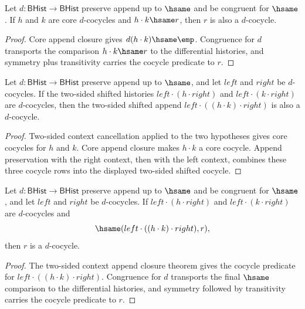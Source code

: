 \begin{theorem}
\label{thm:cohomology-cocycle-append-core-hsame-transport}
Let $d:\mathsf{BHist}\to\mathsf{BHist}$ preserve append up to $\hsame$ and
be congruent for $\hsame$. If $h$ and $k$ are core $d$-cocycles and
$h\cdot k\hsame r$, then $r$ is also a $d$-cocycle.
\end{theorem}
\begin{proof}
Core append closure gives $d(h\cdot k)\hsame\emp$. Congruence for $d$
transports the comparison $h\cdot k\hsame r$ to the differential histories,
and symmetry plus transitivity carries the cocycle predicate to $r$.
\end{proof}

\begin{theorem}
\label{thm:cohomology-cocycle-axis-context-append-closed}
Let $d:\mathsf{BHist}\to\mathsf{BHist}$ preserve append up to $\hsame$, and
let $left$ and $right$ be $d$-cocycles. If the two-sided shifted histories
$left\cdot(h\cdot right)$ and $left\cdot(k\cdot right)$ are $d$-cocycles,
then the two-sided shifted append $left\cdot((h\cdot k)\cdot right)$ is also
a $d$-cocycle.
\end{theorem}
\begin{proof}
Two-sided context cancellation applied to the two hypotheses gives core
cocycles for $h$ and $k$. Core append closure makes $h\cdot k$ a core
cocycle. Append preservation with the right context, then with the left
context, combines these three cocycle rows into the displayed two-sided
shifted cocycle.
\end{proof}

\begin{theorem}
\label{thm:cohomology-cocycle-axis-context-append-hsame-transport}
Let $d:\mathsf{BHist}\to\mathsf{BHist}$ preserve append up to $\hsame$ and
be congruent for $\hsame$, and let $left$ and $right$ be $d$-cocycles. If
$left\cdot(h\cdot right)$ and $left\cdot(k\cdot right)$ are $d$-cocycles
and
$$
\hsame(left\cdot((h\cdot k)\cdot right),r),
$$
then $r$ is a $d$-cocycle.
\end{theorem}
\begin{proof}
The two-sided context append closure theorem gives the cocycle predicate for
$left\cdot((h\cdot k)\cdot right)$. Congruence for $d$ transports the final
$\hsame$ comparison to the differential histories, and symmetry followed by
transitivity carries the cocycle predicate to $r$.
\end{proof}

